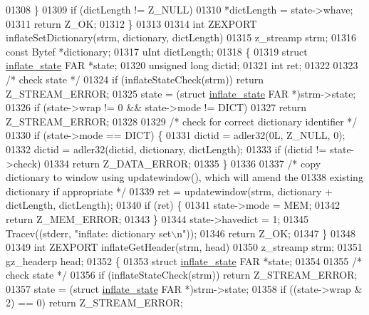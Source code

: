 \begin{DoxyCode}
{{{{{{{{{{{{01308     \}
01309     \textcolor{keywordflow}{if} (dictLength != Z\_NULL)
01310         *dictLength = state->whave;
01311     \textcolor{keywordflow}{return} Z\_OK;
01312 \}
01313 
01314 \textcolor{keywordtype}{int} ZEXPORT inflateSetDictionary(strm, dictionary, dictLength)
01315 z\_streamp strm;
01316 \textcolor{keyword}{const} Bytef *dictionary;
01317 uInt dictLength;
01318 \{
01319     \textcolor{keyword}{struct }\hyperlink{structinflate__state}{inflate\_state} FAR *state;
01320     \textcolor{keywordtype}{unsigned} \textcolor{keywordtype}{long} dictid;
01321     \textcolor{keywordtype}{int} ret;
01322 
01323     \textcolor{comment}{/* check state */}
01324     \textcolor{keywordflow}{if} (inflateStateCheck(strm)) \textcolor{keywordflow}{return} Z\_STREAM\_ERROR;
01325     state = (\textcolor{keyword}{struct }\hyperlink{structinflate__state}{inflate\_state} FAR *)strm->state;
01326     if (state->wrap != 0 && state->mode != DICT)
01327         \textcolor{keywordflow}{return} Z\_STREAM\_ERROR;
01328 
01329     \textcolor{comment}{/* check for correct dictionary identifier */}
01330     \textcolor{keywordflow}{if} (state->mode == DICT) \{
01331         dictid = adler32(0L, Z\_NULL, 0);
01332         dictid = adler32(dictid, dictionary, dictLength);
01333         \textcolor{keywordflow}{if} (dictid != state->check)
01334             \textcolor{keywordflow}{return} Z\_DATA\_ERROR;
01335     \}
01336 
01337     \textcolor{comment}{/* copy dictionary to window using updatewindow(), which will amend the}
01338 \textcolor{comment}{       existing dictionary if appropriate */}
01339     ret = updatewindow(strm, dictionary + dictLength, dictLength);
01340     \textcolor{keywordflow}{if} (ret) \{
01341         state->mode = MEM;
01342         \textcolor{keywordflow}{return} Z\_MEM\_ERROR;
01343     \}
01344     state->havedict = 1;
01345     Tracev((stderr, \textcolor{stringliteral}{"inflate:   dictionary set\(\backslash\)n"}));
01346     \textcolor{keywordflow}{return} Z\_OK;
01347 \}
01348 
01349 \textcolor{keywordtype}{int} ZEXPORT inflateGetHeader(strm, head)
01350 z\_streamp strm;
01351 gz\_headerp head;
01352 \{
01353     \textcolor{keyword}{struct }\hyperlink{structinflate__state}{inflate\_state} FAR *state;
01354 
01355     \textcolor{comment}{/* check state */}
01356     \textcolor{keywordflow}{if} (inflateStateCheck(strm)) \textcolor{keywordflow}{return} Z\_STREAM\_ERROR;
01357     state = (\textcolor{keyword}{struct }\hyperlink{structinflate__state}{inflate\_state} FAR *)strm->state;
01358     if ((state->wrap & 2) == 0) \textcolor{keywordflow}{return} Z\_STREAM\_ERROR;
}}}}}}}}}}}}
\end{DoxyCode}
